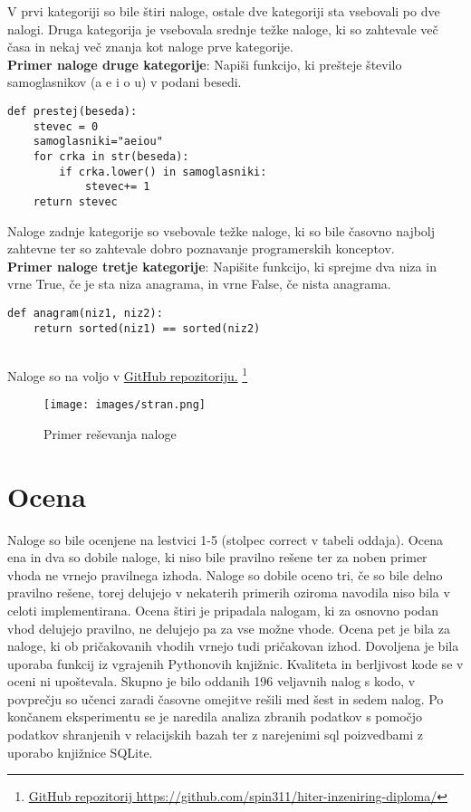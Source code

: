 \documentclass[a4paper,12pt,openright]{book}
\begin{document}
V prvi kategoriji so bile štiri naloge, ostale dve kategoriji sta vsebovali po dve nalogi. Druga kategorija je vsebovala srednje težke naloge, ki so zahtevale več časa  in nekaj več znanja kot naloge prve kategorije. 
\\
\textbf{Primer naloge druge kategorije}:
Napiši funkcijo, ki prešteje število samoglasnikov (a e i o u) v podani besedi.
\begin{lstlisting}[style=python]
def prestej(beseda):
    stevec = 0
    samoglasniki="aeiou"
    for crka in str(beseda):
        if crka.lower() in samoglasniki:
            stevec+= 1
    return stevec
\end{lstlisting}
Naloge zadnje kategorije so vsebovale težke naloge, ki so bile časovno najbolj zahtevne ter so zahtevale dobro poznavanje programerskih konceptov.
\\
\textbf{Primer naloge tretje kategorije}:
Napišite funkcijo, ki sprejme dva niza in vrne True, če je sta niza anagrama, in vrne False, če nista anagrama.
\begin{lstlisting}[style=python]
def anagram(niz1, niz2):
    return sorted(niz1) == sorted(niz2)
    
\end{lstlisting}
Naloge so na voljo v  \href{https://github.com/spin311/hiter-inzeniring-diploma/tree/main/naloge}{GitHub repozitoriju.}
\footnote{\href{https://github.com/spin311/hiter-inzeniring-diploma/}{GitHub repozitorij https://github.com/spin311/hiter-inzeniring-diploma/}}


\begin{figure}[H]
    \centering
    \texttt{[image: images/stran.png]}
    \caption{Primer reševanja naloge}
    \label{fig:stran}
\end{figure}


\section{Ocena}
Naloge so bile ocenjene na lestvici 1-5 (stolpec correct v tabeli oddaja). Ocena ena in dva so dobile naloge, ki niso bile pravilno rešene ter za noben primer vhoda ne vrnejo pravilnega izhoda. Naloge so dobile oceno tri, če so bile delno pravilno rešene, torej delujejo v nekaterih primerih oziroma navodila niso bila v celoti implementirana. Ocena štiri je pripadala nalogam, ki za osnovno podan vhod delujejo pravilno, ne delujejo pa za vse možne vhode. Ocena pet je bila za naloge, ki ob pričakovanih vhodih vrnejo tudi pričakovan izhod. Dovoljena je bila uporaba funkcij iz vgrajenih Pythonovih knjižnic. Kvaliteta in berljivost kode se v oceni ni upoštevala. Skupno je bilo oddanih 196 veljavnih nalog s kodo, v povprečju so učenci zaradi časovne omejitve rešili med šest in sedem nalog. 
Po končanem eksperimentu se je naredila analiza zbranih podatkov s pomočjo podatkov shranjenih v relacijskih bazah ter z narejenimi sql poizvedbami z uporabo knjižnice SQLite.
\end{document}
